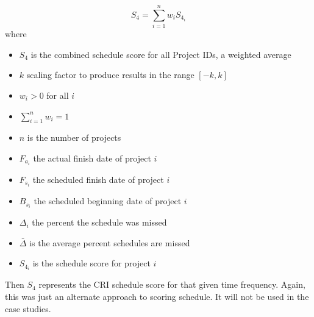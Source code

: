 \documentclass[SDSUThesis.tex]{subfiles}
\begin{document}
                \[
                    S_{4} = \sum\limits^n_{i=1} w_i S_{4_i} 
                \]
                where
                \begin{itemize}
                    \item $S_4$ is the combined schedule score for all Project IDs, 
                    a weighted average
                    \item $k$ scaling factor to produce results in the range $[-k,k]$
                    \item $w_i > 0$ for all $i$
                    \item $\sum\limits^n_{i=1} w_i = 1$
                    \item $n$ is the number of projects
                    \item $F_{a_i}$ the actual finish date of project $i$
                    \item $F_{s_i}$ the scheduled finish date of project $i$
                    \item $B_{s_i}$ the scheduled beginning date of project $i$
                    \item $\Delta_i$ the percent the schedule was missed
                    \item $\bar{\Delta}$ is the average percent schedules are missed
                    \item $S_{4_i}$ is the schedule score for project $i$
                \end{itemize}
                Then $S_4$ represents the CRI schedule score for that given time 
                frequency.
                Again, this was just an alternate approach to scoring schedule.  
                It will not be used in the case studies.
\end{document}
